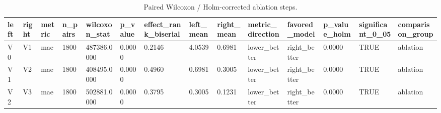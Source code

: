 \begin{table}[htbp]
\centering
\begin{tabular}{llllllllllllll}
\hline
left & right & metric & n_pairs & wilcoxon_stat & p_value & effect_rank_biserial & left_mean & right_mean & metric_direction & favored_model & p_value_holm & significant_0_05 & comparison_group \\
\hline
V0 & V1 & mae & 1800 & 487386.0000 & 0.0000 & 0.2146 & 4.0539 & 0.6981 & lower_better & right_better & 0.0000 & TRUE & ablation \\
V1 & V2 & mae & 1800 & 408495.0000 & 0.0000 & 0.4960 & 0.6981 & 0.3005 & lower_better & right_better & 0.0000 & TRUE & ablation \\
V2 & V3 & mae & 1800 & 502881.0000 & 0.0000 & 0.3795 & 0.3005 & 0.1231 & lower_better & right_better & 0.0000 & TRUE & ablation \\
\hline
\end{tabular}
\caption{Paired Wilcoxon / Holm-corrected ablation steps.}
\label{table_ablation_significance}
\end{table}